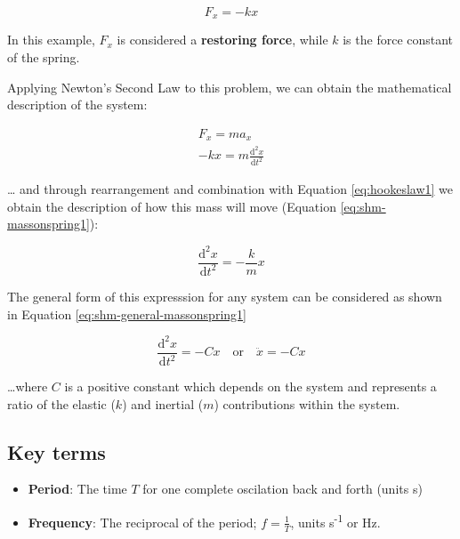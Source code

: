 \documentclass[
]{book}
\providecommand{\tightlist}{%
  \setlength{\itemsep}{0pt}\setlength{\parskip}{0pt}}
\begin{document}
\begin{equation}
F_x = -kx
\label{eq:hookeslaw1}
\end{equation}

In this example, \(F_x\) is considered a \textbf{restoring force}, while \(k\) is the force constant of the spring.

Applying Newton's Second Law to this problem, we can obtain the mathematical description of the system:

\begin{equation}
\begin{aligned}
F_x = ma_x \\
-kx = m\frac{\textrm{d}^2 x}{\textrm{d} t^2}
\end{aligned}
\end{equation}

\ldots{} and through rearrangement and combination with Equation \eqref{eq:hookeslaw1} we obtain the description of how this mass will move (Equation \eqref{eq:shm-massonspring1}):

\begin{equation}
\frac{\textrm{d}^2 x}{\textrm{d} t^2} = -\frac{k}{m}x
\label{eq:shm-massonspring1}
\end{equation}

The general form of this expresssion for any system can be considered as shown in Equation \eqref{eq:shm-general-massonspring1}

\begin{equation}
\frac{\textrm{d}^2 x}{\textrm{d} t^2} = -Cx \quad\mathrm{or}\quad\ddot{x} = -Cx
\label{eq:shm-general-massonspring1}
\end{equation}

\ldots where \(C\) is a positive constant which depends on the system and represents a ratio of the elastic (\(k\)) and inertial (\(m\)) contributions within the system.

\hypertarget{key-terms}{%
\subsection{Key terms}\label{key-terms}}

\begin{itemize}
\tightlist
\item
  \textbf{Period}: The time \(T\) for one complete oscilation back and forth (units s)
\item
  \textbf{Frequency}: The reciprocal of the period; \(f = \frac{1}{T}\), units s\textsuperscript{-1} or Hz.
\end{itemize}
\end{document}
